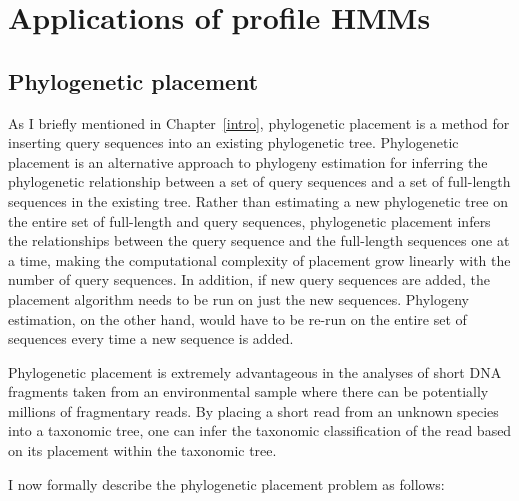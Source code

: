 \section{Applications of profile HMMs}\label{back:app}
\subsection{Phylogenetic placement}
As I briefly mentioned in Chapter~\ref{intro}, phylogenetic placement is a method for inserting query sequences into an existing phylogenetic tree.  Phylogenetic placement is an alternative approach to phylogeny estimation for inferring the phylogenetic relationship between a set of query sequences and a set of full-length sequences in the existing tree.  Rather than estimating a new phylogenetic tree on the entire set of full-length and query sequences, phylogenetic placement infers the relationships between the query sequence and the full-length sequences one at a time, making the computational complexity of placement grow linearly with the number of query sequences.  In addition, if new query sequences are added, the placement algorithm needs to be run on just the new sequences.  Phylogeny estimation, on the other hand, would have to be re-run on the entire set of sequences every time a new sequence is added.  

Phylogenetic placement is extremely advantageous in the analyses of short DNA fragments taken from an environmental sample
where there can be potentially millions of fragmentary reads.  By placing a short read from an unknown species into a taxonomic tree, one can infer the taxonomic classification of the read based on its placement within the taxonomic tree.  

%

I now formally describe the phylogenetic placement problem as follows:

